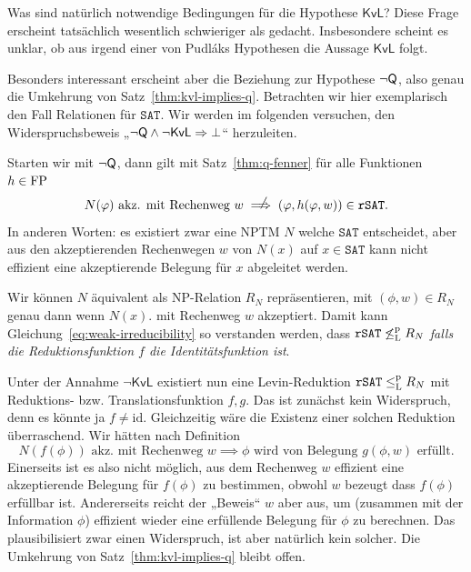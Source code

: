 Was sind natürlich notwendige Bedingungen für die Hypothese $\mathsf{KvL}$? Diese Frage erscheint tatsächlich wesentlich schwieriger als gedacht. Insbesondere scheint es unklar, ob aus irgend einer von Pudláks Hypothesen die Aussage $\mathsf{KvL}$ folgt.

Besonders interessant erscheint aber die Beziehung zur Hypothese $\neg\mathsf{Q}$, also genau die Umkehrung von Satz~\ref{thm:kvl-implies-q}.
Betrachten wir hier exemplarisch den Fall Relationen für $\mathtt{SAT}$. Wir werden im folgenden versuchen, den Widerspruchsbeweis „$\neg\mathsf{Q}\land\neg\mathsf{KvL}\Rightarrow\bot$“ herzuleiten.

Starten wir mit $\neg\mathsf{Q}$, dann gilt mit Satz~\ref{thm:q-fenner} für alle Funktionen $h\in\mathrm{FP}$
\begin{equation} N(\phi) \text{ akz. mit Rechenweg $w$} \rlap{\hspace*{2pt}\raisebox{2.3pt}{$\quad\not$}}\implies  (\phi, h(\phi, w))\in\mathtt{rSAT}.\label{eq:weak-irreducibility} \end{equation}
In anderen Worten: es existiert zwar eine NPTM $N$ welche $\mathtt{SAT}$ entscheidet, aber aus den akzeptierenden Rechenwegen $w$ von $N(x)$ auf $x\in \mathtt{SAT}$ kann nicht effizient eine akzeptierende Belegung für $x$ abgeleitet werden.

Wir können $N$ äquivalent als NP-Relation $R_N$ repräsentieren, mit $(\phi, w) \in R_N$ genau dann wenn $N(x)$. mit Rechenweg $w$ akzeptiert.
Damit kann Gleichung~\ref{eq:weak-irreducibility} so verstanden werden, dass $\mathtt{rSAT} \not\leq_\mathrm{L}^\mathrm{p} R_N$ \emph{falls die Reduktionsfunktion $f$ die Identitätsfunktion ist}.

Unter der Annahme $\neg\mathsf{KvL}$ existiert nun eine Levin-Reduktion $\mathtt{rSAT}\leq_\mathrm{L}^\mathrm{p} R_N$ mit Reduktions- bzw. Translationsfunktion $f,g$. Das ist zunächst kein Widerspruch, denn es könnte ja $f\neq\mathrm{id}$.
%
%
Gleichzeitig wäre die Existenz einer solchen Reduktion überraschend. Wir hätten nach Definition
\[ N(f(\phi)) \text{ akz. mit Rechenweg $w$} \implies \phi \text{ wird von Belegung $g(\phi, w)$ erfüllt}. \]
Einerseits ist es also nicht möglich, aus dem Rechenweg $w$ effizient eine akzeptierende Belegung für $f(\phi)$ zu bestimmen, obwohl $w$ bezeugt dass $f(\phi)$ erfüllbar ist.
Andererseits reicht der „Beweis“ $w$ aber aus, um (zusammen mit der Information $\phi$) effizient wieder eine erfüllende Belegung für $\phi$ zu berechnen. 
Das plausibilisiert zwar einen Widerspruch, ist aber natürlich kein solcher. Die Umkehrung von Satz~\ref{thm:kvl-implies-q} bleibt offen.

